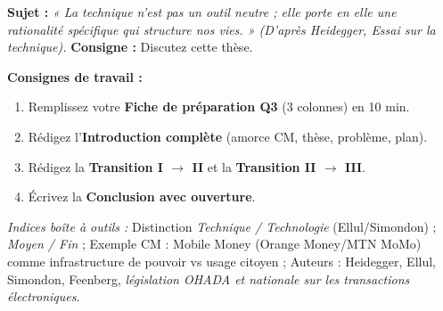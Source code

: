 \documentclass[11pt]{article}
\begin{document}
\begin{exercice}
\textbf{Sujet :} \textit{« La technique n'est pas un outil neutre ; elle porte en elle une rationalité spécifique qui structure nos vies. » (D'après Heidegger, \emph{Essai sur la technique}).}
\textbf{Consigne :} Discutez cette thèse.

\textbf{Consignes de travail :}
\begin{enumerate}
    \item Remplissez votre \textbf{Fiche de préparation Q3} (3 colonnes) en 10 min.
    \item Rédigez l'\textbf{Introduction complète} (amorce CM, thèse, problème, plan).
    \item Rédigez la \textbf{Transition I $\rightarrow$ II} et la \textbf{Transition II $\rightarrow$ III}.
    \item Écrivez la \textbf{Conclusion avec ouverture}.
\end{enumerate}
\textit{Indices boîte à outils :} Distinction \emph{Technique / Technologie} (Ellul/Simondon) ; \emph{Moyen / Fin} ; Exemple CM : Mobile Money (Orange Money/MTN MoMo) comme infrastructure de pouvoir vs usage citoyen ; Auteurs : Heidegger, Ellul, Simondon, Feenberg, \emph{législation OHADA et nationale sur les transactions électroniques}.
\end{exercice}
\end{document}
